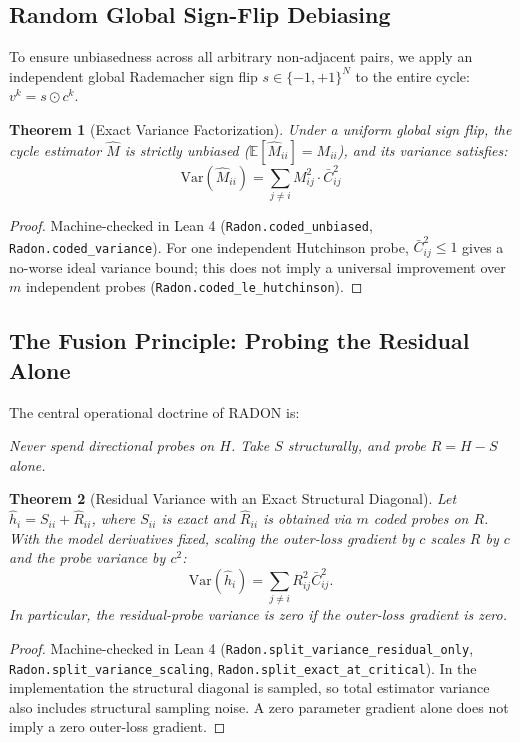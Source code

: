 \documentclass[11pt,a4paper]{article}
\newtheorem{theorem}{Theorem}
\theoremstyle{definition}
\theoremstyle{remark}
\begin{document}
\subsection{Random Global Sign-Flip Debiasing}

To ensure unbiasedness across all arbitrary non-adjacent pairs, we apply an independent global Rademacher sign flip $s \in \{-1, +1\}^N$ to the entire cycle: $v^k = s \odot c^k$.

\begin{theorem}[Exact Variance Factorization]
Under a uniform global sign flip, the cycle estimator $\hat{M}$ is strictly unbiased ($\mathbb{E}[\hat{M}_{ii}] = M_{ii}$), and its variance satisfies:
\begin{equation}
\mathrm{Var}(\hat{M}_{ii}) = \sum_{j \neq i} M_{ij}^2 \cdot \bar{C}_{ij}^2
\end{equation}
\end{theorem}
\begin{proof}
Machine-checked in Lean 4 (\texttt{Radon.coded\_unbiased}, \texttt{Radon.coded\_variance}). For one independent Hutchinson probe, $\bar{C}_{ij}^2 \le 1$ gives a no-worse ideal variance bound; this does not imply a universal improvement over $m$ independent probes (\texttt{Radon.coded\_le\_hutchinson}).
\end{proof}

\subsection{The Fusion Principle: Probing the Residual Alone}

The central operational doctrine of RADON is:
\begin{center}
\textit{Never spend directional probes on $H$. Take $S$ structurally, and probe $R = H - S$ alone.}
\end{center}

\begin{theorem}[Residual Variance with an Exact Structural Diagonal]
Let $\hat{h}_i = S_{ii} + \hat{R}_{ii}$, where $S_{ii}$ is exact and $\hat{R}_{ii}$ is obtained via $m$ coded probes on $R$. With the model derivatives fixed, scaling the outer-loss gradient by $c$ scales $R$ by $c$ and the probe variance by $c^2$:
\begin{equation}
\mathrm{Var}(\hat{h}_i) = \sum_{j \neq i} R_{ij}^2 \bar{C}_{ij}^2.
\end{equation}
In particular, the residual-probe variance is zero if the outer-loss gradient is zero.
\end{theorem}
\begin{proof}
Machine-checked in Lean 4 (\texttt{Radon.split\_variance\_residual\_only}, \texttt{Radon.split\_variance\_scaling}, \texttt{Radon.split\_exact\_at\_critical}). In the implementation the structural diagonal is sampled, so total estimator variance also includes structural sampling noise. A zero parameter gradient alone does not imply a zero outer-loss gradient.
\end{proof}
\end{document}
